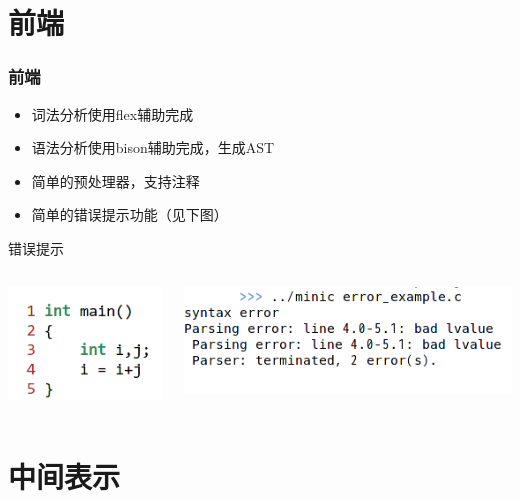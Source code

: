 \documentclass{beamer}
\begin{document}
\section{前端}
\begin{frame}
	\frametitle{前端}
	\begin{block}{\phantom{x}}
	\begin{itemize}
		\item 词法分析使用flex辅助完成
		\item 语法分析使用bison辅助完成，生成AST
		\item 简单的预处理器，支持注释
		\item 简单的错误提示功能（见下图）
	\end{itemize}
	\end{block}
	\begin{block}{错误提示}
	\begin{columns}
		\begin{flushleft}
		\includegraphics[scale=0.5]{error_example_left.png}
		\end{flushleft}
		\begin{flushleft}
		\includegraphics[scale=0.5]{error_example_right.png}
		\end{flushleft}
	\end{columns}
	\end{block}
\end{frame}

\section{中间表示}
\end{document}
